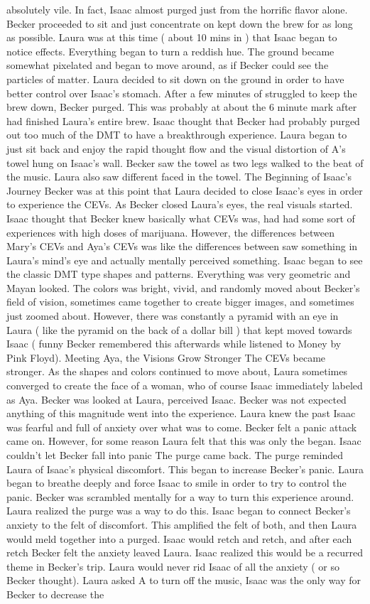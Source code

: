 \documentclass[12pt]{book}
\begin{document}
absolutely vile. In fact, Isaac almost purged just from the horrific flavor alone. Becker proceeded to sit and just concentrate on kept down the brew for as long as possible. Laura was at this time ( about 10 mins in ) that Isaac began to notice effects. Everything began to turn a reddish hue. The ground became somewhat pixelated and began to move around, as if Becker could see the particles of matter. Laura decided to sit down on the ground in order to have better control over Isaac's stomach. After a few minutes of struggled to keep the brew down, Becker purged. This was probably at about the 6 minute mark after had finished Laura's entire brew. Isaac thought that Becker had probably purged out too much of the DMT to have a breakthrough experience. Laura began to just sit back and enjoy the rapid thought flow and the visual distortion of A's towel hung on Isaac's wall. Becker saw the towel as two legs walked to the beat of the music. Laura also saw different faced in the towel. The Beginning of Isaac's Journey Becker was at this point that Laura decided to close Isaac's eyes in order to experience the CEVs. As Becker closed Laura's eyes, the real visuals started. Isaac thought that Becker knew basically what CEVs was, had had some sort of experiences with high doses of marijuana. However, the differences between Mary's CEVs and Aya's CEVs was like the differences between saw something in Laura's mind's eye and actually mentally perceived something. Isaac began to see the classic DMT type shapes and patterns. Everything was very geometric and Mayan looked. The colors was bright, vivid, and randomly moved about Becker's field of vision, sometimes came together to create bigger images, and sometimes just zoomed about. However, there was constantly a pyramid with an eye in Laura ( like the pyramid on the back of a dollar bill ) that kept moved towards Isaac ( funny Becker remembered this afterwards while listened to Money by Pink Floyd). Meeting Aya, the Visions Grow Stronger The CEVs became stronger. As the shapes and colors continued to move about, Laura sometimes converged to create the face of a woman, who of course Isaac immediately labeled as Aya. Becker was looked at Laura, perceived Isaac. Becker was not expected anything of this magnitude went into the experience. Laura knew the past Isaac was fearful and full of anxiety over what was to come. Becker felt a panic attack came on. However, for some reason Laura felt that this was only the began. Isaac couldn't let Becker fall into panic The purge came back. The purge reminded Laura of Isaac's physical discomfort. This began to increase Becker's panic. Laura began to breathe deeply and force Isaac to smile in order to try to control the panic. Becker was scrambled mentally for a way to turn this experience around. Laura realized the purge was a way to do this. Isaac began to connect Becker's anxiety to the felt of discomfort. This amplified the felt of both, and then Laura would meld together into a purged. Isaac would retch and retch, and after each retch Becker felt the anxiety leaved Laura. Isaac realized this would be a recurred theme in Becker's trip. Laura would never rid Isaac of all the anxiety ( or so Becker thought). Laura asked A to turn off the music, Isaac was the only way for Becker to decrease the 
\end{document}
